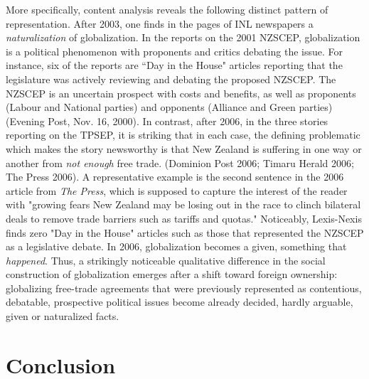 \documentclass[12pt]{report}
\begin{document}
More specifically, content analysis reveals the following distinct pattern of representation. After 2003, one finds in the pages of INL newspapers a \emph{naturalization} of globalization. In the reports on the 2001 NZSCEP, globalization is a political phenomenon with proponents and critics debating the issue. For instance, six of the reports are ``Day in the House" articles reporting that the legislature was actively reviewing and debating the proposed NZSCEP. The NZSCEP is an uncertain prospect with costs and benefits, as well as proponents (Labour and National parties) and opponents (Alliance and Green parties) (Evening Post, Nov. 16, 2000). In contrast, after 2006, in the three stories reporting on the TPSEP, it is striking that in each case, the defining problematic which makes the story newsworthy is that New Zealand is suffering in one way or another from \emph{not enough} free trade. (Dominion Post 2006; Timaru Herald 2006; The Press 2006). A representative example is the second sentence in the 2006 article from \emph{The Press}, which is supposed to capture the interest of the reader with "growing fears New Zealand may be losing out in the race to clinch bilateral deals to remove trade barriers such as tariffs and quotas." Noticeably, Lexis-Nexis finds zero "Day in the House" articles such as those that represented the NZSCEP as a legislative debate. In 2006, globalization becomes a given, something that \emph{happened}. Thus, a strikingly noticeable qualitative difference in the social construction of globalization emerges after a shift toward foreign ownership: globalizing free-trade agreements that were previously represented as contentious, debatable, prospective political issues become already decided, hardly arguable, given or naturalized facts.


\section{Conclusion}
\end{document}
